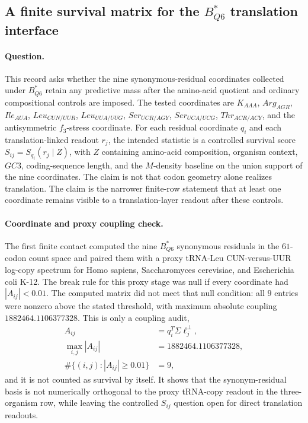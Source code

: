 \subsection{A finite survival matrix for the $B^{*}_{Q6}$ translation interface}
\label{sec:bior-translation-survival-b-star-q6-survival-matrix}

\paragraph{Question.}
This record asks whether the nine synonymous-residual coordinates collected under $B^{*}_{Q6}$ retain any predictive mass after the amino-acid quotient and ordinary compositional controls are imposed. The tested coordinates are $K_{AAA}$, $Arg_{AGR}$, $Ile_{AUA}$, $Leu_{CUN/UUR}$, $Leu_{UUA/UUG}$, $Ser_{UCR/AGY}$, $Ser_{UCA/UCG}$, $Thr_{ACR/ACY}$, and the antisymmetric $f_3$-stress coordinate. For each residual coordinate $q_i$ and each translation-linked readout $r_j$, the intended statistic is a controlled survival score $S_{ij}=S_{q_i}(r_j\mid Z)$, with $Z$ containing amino-acid composition, organism context, $GC3$, coding-sequence length, and the $M$-density baseline on the union support of the nine coordinates. The claim is not that codon geometry alone realizes translation. The claim is the narrower finite-row statement that at least one coordinate remains visible to a translation-layer readout after these controls.

\paragraph{Coordinate and proxy coupling check.}
The first finite contact computed the nine $B^{*}_{Q6}$ synonymous residuals in the $61$-codon count space and paired them with a proxy tRNA-Leu CUN-versus-UUR log-copy spectrum for Homo sapiens, Saccharomyces cerevisiae, and Escherichia coli K-12. The break rule for this proxy stage was null if every coordinate had $|A_{ij}|<0.01$. The computed matrix did not meet that null condition: all $9$ entries were nonzero above the stated threshold, with maximum absolute coupling $1882464.1106377328$. This is only a coupling audit,
$$
\begin{aligned}
A_{ij} &= q_i^{T}\Sigma\ell_j^{\perp},\\
\max_{i,j}|A_{ij}| &= 1882464.1106377328,\\
\#\{(i,j): |A_{ij}|\geq 0.01\} &= 9,
\end{aligned}
$$
and it is not counted as survival by itself. It shows that the synonym-residual basis is not numerically orthogonal to the proxy tRNA-copy readout in the three-organism row, while leaving the controlled $S_{ij}$ question open for direct translation readouts.

